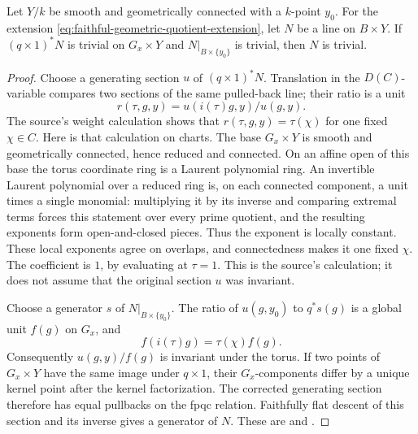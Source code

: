 \begin{srlemma}
\label{lem:faithful-torus-quotient-seesaw}
Let \(Y/k\) be smooth and geometrically connected with a
\(k\)-point \(y_0\).  For the extension
\eqref{eq:faithful-geometric-quotient-extension}, let \(N\) be
a line on \(B\times Y\).
If \((q\times1)^*N\) is trivial on \(G_x\times Y\) and
\(N|_{B\times\{y_0\}}\) is trivial, then \(N\) is trivial.
\end{srlemma}
\begin{proof}
Choose a generating section \(u\) of \((q\times1)^*N\).
Translation in the \(D(C)\)-variable compares two sections
of the same pulled-back line; their ratio is a unit
\[
             r(\tau,g,y)=u(i(\tau)g,y)/u(g,y).
\]
The source's weight calculation shows that
\(r(\tau,g,y)=\tau(\chi)\) for one fixed \(\chi\in C\).
Here is that calculation on charts.
The base \(G_x\times Y\) is smooth and geometrically connected,
hence reduced and connected.
On an affine open of this base the torus coordinate ring is
a Laurent polynomial ring.  An invertible Laurent polynomial
over a reduced ring is, on each connected component, a unit
times a single monomial: multiplying it by its inverse and
comparing extremal terms forces this statement over every
prime quotient, and the resulting exponents form open-and-closed
pieces.  Thus the exponent is locally constant.
These local exponents agree on overlaps, and connectedness
makes it one fixed \(\chi\).
The coefficient is \(1\), by evaluating at \(\tau=1\).
This is the source's  calculation; it
does not assume that the original section \(u\) was invariant.

Choose a generator \(s\) of \(N|_{B\times\{y_0\}}\).
The ratio of \(u(g,y_0)\) to \(q^*s(g)\) is a global unit
\(f(g)\) on \(G_x\), and
\[
                   f(i(\tau)g)=\tau(\chi)f(g).
\]
Consequently \(u(g,y)/f(g)\) is invariant under the torus.
If two points of \(G_x\times Y\) have the same image under
\(q\times1\), their \(G_x\)-components differ by a unique
kernel point after the kernel factorization.
The corrected generating section therefore has equal
pullbacks on the fpqc relation.
Faithfully flat descent of this section and its inverse
gives a generator of \(N\).
These are  and
.
\end{proof}

